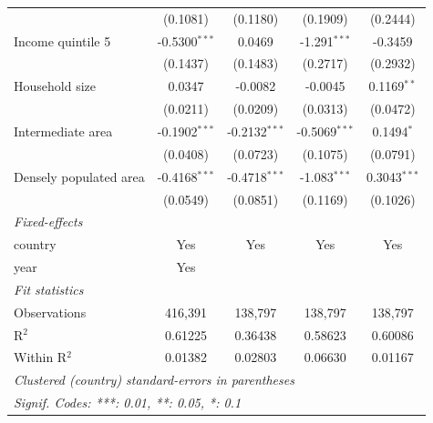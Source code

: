 \begin{tabular}{lcccc}
                              & (0.1081)        & (0.1180)        & (0.1909)        & (0.2444)\\   
   Income quintile 5          & -0.5300$^{***}$ & 0.0469          & -1.291$^{***}$  & -0.3459\\   
                              & (0.1437)        & (0.1483)        & (0.2717)        & (0.2932)\\   
   Household size             & 0.0347          & -0.0082         & -0.0045         & 0.1169$^{**}$\\   
                              & (0.0211)        & (0.0209)        & (0.0313)        & (0.0472)\\   
   Intermediate area          & -0.1902$^{***}$ & -0.2132$^{***}$ & -0.5069$^{***}$ & 0.1494$^{*}$\\   
                              & (0.0408)        & (0.0723)        & (0.1075)        & (0.0791)\\   
   Densely populated area     & -0.4168$^{***}$ & -0.4718$^{***}$ & -1.083$^{***}$  & 0.3043$^{***}$\\   
                              & (0.0549)        & (0.0851)        & (0.1169)        & (0.1026)\\   
   \midrule
   \emph{Fixed-effects}\\
   country                    & Yes             & Yes             & Yes             & Yes\\  
   year                       & Yes             &                 &                 & \\  
   \midrule
   \emph{Fit statistics}\\
   Observations               & 416,391         & 138,797         & 138,797         & 138,797\\  
   R$^2$                      & 0.61225         & 0.36438         & 0.58623         & 0.60086\\  
   Within R$^2$               & 0.01382         & 0.02803         & 0.06630         & 0.01167\\  
   \midrule \midrule
   \multicolumn{5}{l}{\emph{Clustered (country) standard-errors in parentheses}}\\
   \multicolumn{5}{l}{\emph{Signif. Codes: ***: 0.01, **: 0.05, *: 0.1}}\\
\end{tabular}
\par\endgroup


